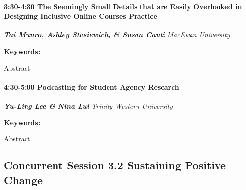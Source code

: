 \documentclass[
]{book}
\begin{document}
\begin{session}
\hypertarget{the-seemingly-small-details-that-are-easily-overlooked-in-designing-inclusive-online-courses-practice}{%
\paragraph*{\texorpdfstring{3:30-4:30 \textbar{} \textbf{The Seemingly
Small Details that are Easily Overlooked in Designing Inclusive Online
Courses} \textbar{}
Practice}{3:30-4:30 \textbar{} The Seemingly Small Details that are Easily Overlooked in Designing Inclusive Online Courses \textbar{} Practice}}\label{the-seemingly-small-details-that-are-easily-overlooked-in-designing-inclusive-online-courses-practice}}

\textbf{\emph{Tai Munro, Ashley Stasiewich, \& Susan Cauti}} \textbar{}
\emph{MacEwan University}

\textbf{Keywords:}

Abstract
\end{session}
\begin{session}
\hypertarget{podcasting-for-student-agency-research}{%
\paragraph*{\texorpdfstring{4:30-5:00 \textbar{} \textbf{Podcasting for
Student Agency} \textbar{}
Research}{4:30-5:00 \textbar{} Podcasting for Student Agency \textbar{} Research}}\label{podcasting-for-student-agency-research}}

\textbf{\emph{Yu-Ling Lee \& Nina Lui}} \textbar{} \emph{Trinity Western
University}

\textbf{Keywords:}

Abstract
\end{session}

\hypertarget{concurrent-session-3.2-sustaining-positive-change}{%
\subsection*{Concurrent Session 3.2 \textbar{} Sustaining Positive Change}\label{concurrent-session-3.2-sustaining-positive-change}}
\end{document}
